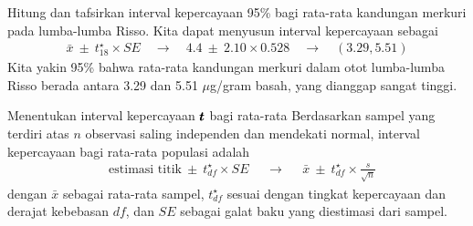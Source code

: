 

\begin{examplewrap}
\begin{nexample}{Hitung dan tafsirkan interval kepercayaan 95\%
    bagi rata-rata kandungan merkuri pada lumba-lumba Risso.}
  Kita dapat menyusun interval kepercayaan sebagai
  \begin{align*}
  \bar{x} \ \pm\  t^{\star}_{18} \times SE
    \quad \to \quad 4.4 \ \pm\  2.10 \times 0.528
    \quad \to \quad (3.29, 5.51)
  \end{align*}
  Kita yakin 95\% bahwa rata-rata kandungan merkuri dalam otot
  lumba-lumba Risso berada antara 3.29 dan 5.51 $\mu$g/gram basah,
  yang dianggap sangat tinggi.
\end{nexample}
\end{examplewrap}


\begin{onebox}{Menentukan
    interval kepercayaan $\pmb{\MakeLowercase{t}}$
    bagi rata-rata}
  Berdasarkan sampel yang terdiri atas $n$ observasi saling independen
  dan mendekati normal, interval kepercayaan bagi rata-rata
  populasi adalah
  \begin{align*}
  &\text{estimasi titik} \ \pm\  t^{\star}_{df} \times SE
  &&\to
  &&\bar{x} \ \pm\  t^{\star}_{df} \times \frac{s}{\sqrt{n}}
  \end{align*}
  dengan $\bar{x}$ sebagai rata-rata sampel, $t^{\star}_{df}$
  sesuai dengan tingkat kepercayaan dan derajat kebebasan
  $df$, dan $SE$ sebagai galat baku yang diestimasi dari
  sampel.
\end{onebox}
